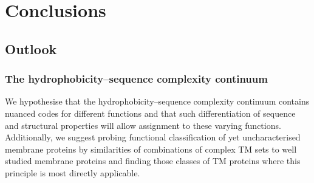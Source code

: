 \chapter{Conclusions}
\section{Outlook}
\subsection{The hydrophobicity\---sequence complexity continuum}
We hypothesise that the hydrophobicity\---sequence complexity continuum contains nuanced codes for different functions and that such differentiation of sequence and structural properties will allow assignment to these varying functions.  Additionally, we suggest probing functional classification of yet uncharacterised membrane proteins by similarities of combinations of complex TM sets to well studied membrane proteins and finding those classes of TM proteins where this principle is most directly applicable.
